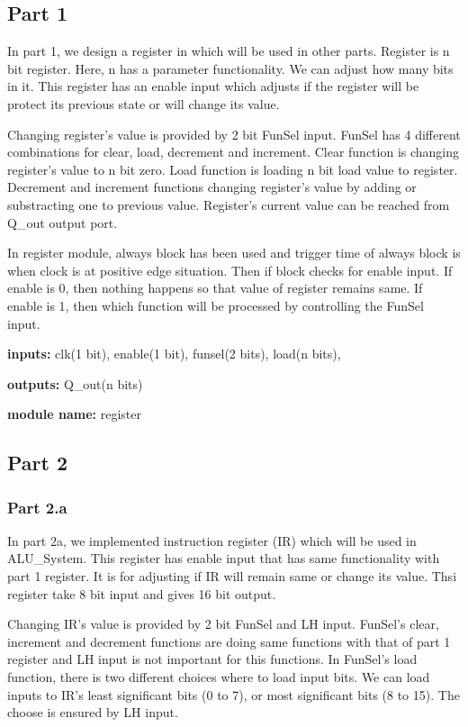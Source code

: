\documentclass[pdftex,12pt,a4paper]{article}
\begin{document}
\subsection{Part 1}
In part 1, we design a register in which will be used in other parts. Register
is n bit register. Here, n has a parameter functionality. We can adjust 
how many bits in it. This register has an enable input which adjusts 
if the register will be protect
its previous state or will change its value. 

Changing register's value is
provided by 2 bit FunSel input. FunSel has 4 different combinations for clear,
load, decrement and increment. Clear function is changing register's value to
n bit zero. Load function is loading n bit load value to register. Decrement and
increment functions changing register's value by adding or substracting one to
previous value. Register's current value can be reached from Q_out output port.

In register module, always block has been used and trigger time of always block
is when clock is at positive edge situation. Then if block checks for enable input.
If enable is 0, then nothing happens so that value of register remains same. If
enable is 1, then which function will be processed by controlling the FunSel input.

\textbf{inputs:}    clk(1 bit),
enable(1 bit),
funsel(2 bits),
load(n bits),

\textbf{outputs:}    
Q_out(n bits)

\textbf{module name:} register

\subsection{Part 2}
\subsubsection{Part 2.a}
In part 2a, we implemented instruction register (IR) which will be used in ALU_System.
This register has enable input that has same functionality with part 1 register. It
is for adjusting if IR will remain same or change its value. Thsi register take 8
bit input and gives 16 bit output.

Changing IR's value is provided by 2 bit FunSel and LH input. FunSel's clear,
increment and decrement functions are doing same functions with that of part 1
register and LH input is not important for this functions. In FunSel's load function,
there is two different choices where to load input bits. We can load inputs to IR's
least significant bits (0 to 7), or most significant bits (8 to 15). The choose is
ensured by LH input.
\end{document}
